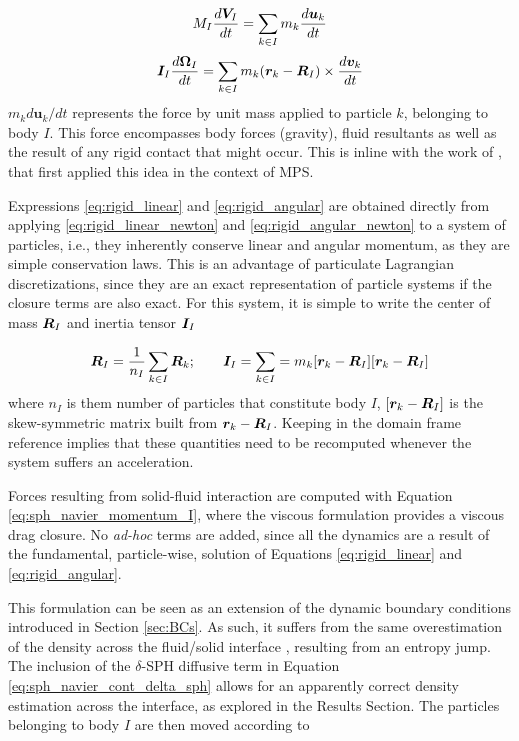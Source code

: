 %
\begin{equation} \label{eq:rigid_linear}
	M_I\frac{d\boldsymbol{V}_I}{dt}=\sum_{k\in I} m_k \frac{{d{\boldsymbol{u}_k}}}{{dt}}
\end{equation}
%
\begin{equation} \label{eq:rigid_angular}
	\boldsymbol{I}_I\frac{d\boldsymbol{\Omega}_I}{dt}=\sum_{k\in I}m_k(\boldsymbol{r}_k-\boldsymbol{R}_I)\times \frac{{d{\boldsymbol{v}_k}}}{{dt}}
\end{equation}
%
$m_k {{d{\boldsymbol{u}_k}}}/{{dt}}$ represents the force by unit mass applied to particle $k$, belonging to body $I$. This force encompasses body forces (gravity), fluid resultants as well as the result of any rigid contact that might occur. This is inline with the work of \cite{Koshizuka-1998}, that first applied this idea in the context of \ac{MPS}.

Expressions \eqref{eq:rigid_linear} and \eqref{eq:rigid_angular} are obtained directly from applying \eqref{eq:rigid_linear_newton} and \eqref{eq:rigid_angular_newton} to a system of particles, i.e., they inherently conserve linear and angular momentum, as they are simple conservation laws. This is an advantage of particulate Lagrangian discretizations, since they are an exact representation of particle systems if the closure terms are also exact. For this system, it is simple to write the center of mass $\boldsymbol{R}_I$ and inertia tensor $\boldsymbol{I}_I$

%
\begin{equation} \label{eq:rigid_center_inertia}
	\boldsymbol{R}_I=\frac{1}{n_I}\sum_{k\in I} \boldsymbol{R}_k; \;\;\;\;\;\;\; \boldsymbol{I}_I=\sum_{k\in I}=m_k[\boldsymbol{r}_k-\boldsymbol{R}_I][\boldsymbol{r}_k-\boldsymbol{R}_I]
\end{equation}
%
where $n_I$ is them number of particles that constitute body $I$, $[\boldsymbol{r}_k-\boldsymbol{R}_I]$ is the skew-symmetric matrix built from $\boldsymbol{r}_k-\boldsymbol{R}_I$. Keeping in the domain frame reference implies that these quantities need to be recomputed whenever the system suffers an acceleration. 

Forces resulting from solid-fluid interaction are computed with Equation \eqref{eq:sph_navier_momentum_I}, where the viscous formulation provides a viscous drag closure. No \textit{ad-hoc} terms are added, since all the dynamics are a result of the fundamental, particle-wise, solution of Equations \eqref{eq:rigid_linear} and \eqref{eq:rigid_angular}.

This formulation can be seen as an extension of the dynamic boundary conditions introduced in Section \ref{sec:BCs}. As such, it suffers from the same overestimation of the density across the fluid/solid interface \cite{Price-2008,Saitoh-2013}, resulting from an entropy jump. The inclusion of the $\delta$-SPH diffusive term in Equation \eqref{eq:sph_navier_cont_delta_sph} allows for an apparently correct density estimation across the interface, as explored in the Results Section. The particles belonging to body $I$ are then moved according to

